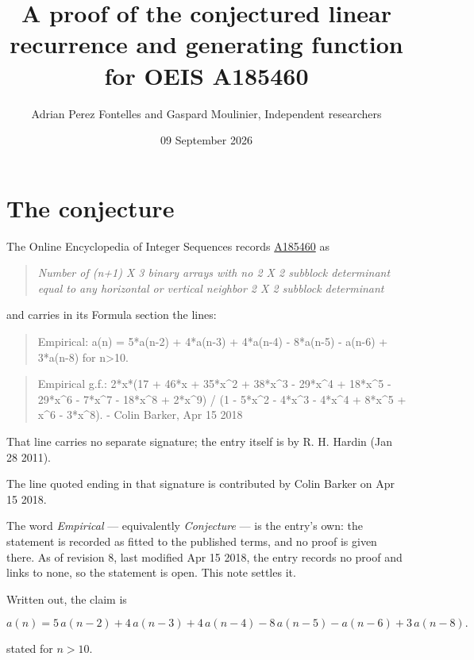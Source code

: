 \documentclass[11pt]{article}
\title{A proof of the conjectured linear recurrence and generating function for OEIS A185460}
\author{Adrian Perez Fontelles and Gaspard Moulinier, Independent researchers}
\date{09 September 2026}
\theoremstyle{definition}
\begin{document}
\maketitle
\section{The conjecture}

The Online Encyclopedia of Integer Sequences records \href{https://oeis.org/A185460}{A185460} as

\begin{quote}\itshape Number of (n+1) X 3 binary arrays with no 2 X 2 subblock determinant equal to any horizontal or vertical neighbor 2 X 2 subblock determinant\end{quote}

and carries in its Formula section the lines:

\begin{quote}\ttfamily Empirical: a(n) = 5*a(n-2) + 4*a(n-3) + 4*a(n-4) - 8*a(n-5) - a(n-6) + 3*a(n-8) for n>10.\end{quote}

\begin{quote}\ttfamily Empirical g.f.: 2*x*(17 + 46*x + 35*x\textasciicircum{}2 + 38*x\textasciicircum{}3 - 29*x\textasciicircum{}4 + 18*x\textasciicircum{}5 - 29*x\textasciicircum{}6 - 7*x\textasciicircum{}7 - 18*x\textasciicircum{}8 + 2*x\textasciicircum{}9) / (1 - 5*x\textasciicircum{}2 - 4*x\textasciicircum{}3 - 4*x\textasciicircum{}4 + 8*x\textasciicircum{}5 + x\textasciicircum{}6 - 3*x\textasciicircum{}8). - Colin Barker, Apr 15 2018\end{quote}

That line carries no separate signature; the entry itself is by R. H. Hardin (Jan 28 2011).

The line quoted ending in that signature is contributed by Colin Barker on Apr 15 2018.

The word {\itshape Empirical} --- equivalently {\itshape Conjecture} --- is the entry's own: the statement is recorded as fitted to the published terms, and no proof is given there. As of revision 8, last modified Apr 15 2018, the entry records no proof and links to none, so the statement is open. This note settles it.

Written out, the claim is

\[a(n) = 5\,a(n-2) + 4\,a(n-3) + 4\,a(n-4) - 8\,a(n-5) - a(n-6) + 3\,a(n-8).\]

stated for $n > 10$.
\end{document}
